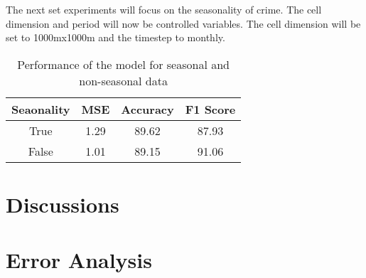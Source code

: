     The next set experiments will focus on the seasonality of crime. The cell dimension and period will now be controlled variables. The cell dimension will be set to 1000mx1000m and the timestep to monthly.
    \begin{table}[h]
      \centering
      \begin{tabular}{|c|c|c|c|}
            \hline
          \textbf{Seaonality}  &\textbf{MSE}  &\textbf{Accuracy} &\textbf{F1 Score}\\ 
          \hline
          True  &1.29 &89.62 &87.93 \\
          False &1.01 &89.15 &91.06\\
          \hline
        \end{tabular}
      \caption{Performance of the model for seasonal and non-seasonal data}
    \end{table}


\section{Discussions}

\section{Error Analysis}

